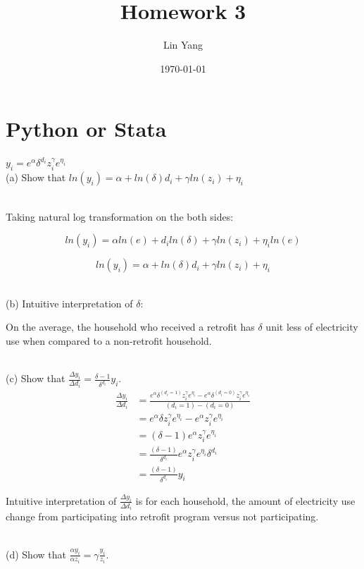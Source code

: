 \documentclass{article}
\title{Homework 3}
\author{Lin Yang}
\date{\today}
\begin{document}
\maketitle  
\section{Python or Stata}
$y_i = e^\alpha \delta^{d_i} z_i^\gamma e^{\eta_i}$
~\\
(a) Show that $ln(y_i) = \alpha + ln(\delta) d_i+ \gamma ln(z_i) + \eta_i$

~\\
Taking natural log transformation on the both sides: 

$$ln(y_i) = \alpha ln(e) + d_i ln(\delta) + \gamma ln(z_i) + \eta_i ln(e)$$

$$ln(y_i) = \alpha + ln(\delta) d_i  + \gamma ln(z_i) + \eta_i$$

~\\
(b) Intuitive interpretation of $\delta$:

 On the average, the household who received a retrofit has $\delta$ unit less of electricity use when compared to a non-retrofit household. 


~\\
(c) Show that $\frac{\Delta y_i}{\Delta d_i} = \frac{\delta-1}{\delta^{d_i}}y_i$. \\
\begin{equation}
\begin{split}
\frac{\Delta y_i}{\Delta d_i} &= \frac{e^\alpha \delta^{(d_i =1)} z_i^\gamma e^{\eta_i}- e^\alpha \delta^{(d_i =0)} z_i^\gamma e^{\eta_i}}{(d_i =1)-(d_i =0)}\\
	&= e^\alpha \delta z_i^\gamma e^{\eta_i}- e^\alpha  z_i^\gamma e^{\eta_i} \\ &=(\delta-1)e^\alpha  z_i^\gamma e^{\eta_i} \\
		 &= \frac{(\delta-1)}{\delta^{d_i} } e^\alpha  z_i^\gamma e^{\eta_i} \delta^{d_i}\\
		  &= \frac{(\delta-1)}{\delta^{d_i} } y_i
\end{split}
\end{equation}

Intuitive interpretation of $\frac{\Delta y_i}{\Delta d_i} $ is for each household, the amount of electricity use change from participating into retrofit program versus not participating. 

~\\
(d) Show that $\frac{\alpha y_i}{\alpha z_i} = \gamma \frac{y_i}{z_i}$. \\
\end{document}
